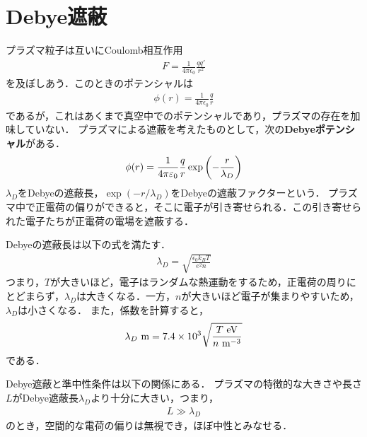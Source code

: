 \documentclass{report}
\begin{document}
\section{Debye遮蔽}
プラズマ粒子は互いにCoulomb相互作用
\begin{align}
  F = \frac{1}{4\pi \epsilon_0}\frac{qq'}{r^2}
\end{align}
を及ぼしあう．このときのポテンシャルは
\begin{align}
  \phi(r) = \frac{1}{4\pi \epsilon_0}\frac{q}{r}
\end{align}
であるが，これはあくまで真空中でのポテンシャルであり，プラズマの存在を加味していない．
プラズマによる遮蔽を考えたものとして，次の\textbf{Debyeポテンシャル}がある．
\begin{align}
  \phi(r) = \frac{1}{4\pi\varepsilon_0}\frac{q}{r}\exp\qty(-\frac{r}{\lambda_D})
\end{align}
$\lambda_D$をDebyeの遮蔽長，$\exp(-r/\lambda_D)$をDebyeの遮蔽ファクターという．
プラズマ中で正電荷の偏りができると，そこに電子が引き寄せられる．この引き寄せられた電子たちが正電荷の電場を遮蔽する．

Debyeの遮蔽長は以下の式を満たす．
\begin{align}
  \lambda_D = \sqrt{\frac{\epsilon_0 k_B T}{e^2 n}}
\end{align}
つまり，$T$が大きいほど，電子はランダムな熱運動をするため，正電荷の周りにとどまらず，$\lambda_D$は大きくなる．一方，$n$が大きいほど電子が集まりやすいため，$\lambda_D$は小さくなる．
また，係数を計算すると，
\begin{align}
  \lambda_D \ \r{m} = 7.4\times10^3\sqrt{\frac{T\ \r{eV}}{n\ \r{m}^{-3}}}
\end{align}
である．

Debye遮蔽と準中性条件は以下の関係にある．
プラズマの特徴的な大きさや長さ$L$がDebye遮蔽長$\lambda_D$より十分に大きい，つまり，
\begin{align}
  L \gg \lambda_D
\end{align}
のとき，空間的な電荷の偏りは無視でき，ほぼ中性とみなせる．
\end{document}

